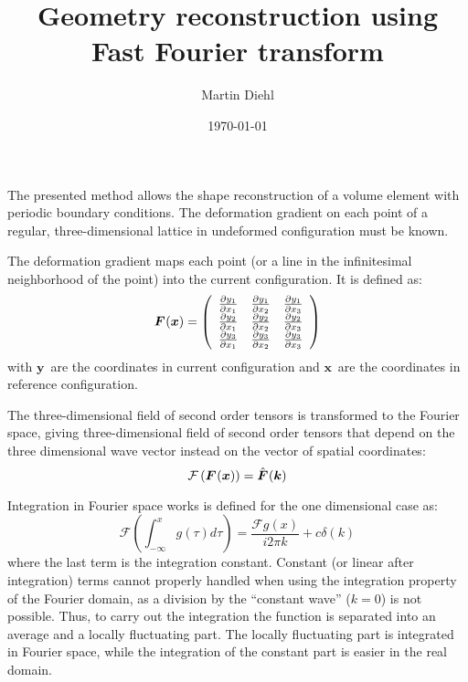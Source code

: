 \documentclass[a4paper,12pt]{article}
\title{Geometry reconstruction using Fast Fourier transform}
\date{\today}
\author{Martin Diehl}
\newcommand{\tnsr}[1]{\ensuremath{\bm{{#1}}}}
\newcommand{\vctr}[1]{\ensuremath{\bm{#1}}}
\newcommand{\F}[1][]{\ensuremath{\tnsr F^{{\rm #1}}}}
\begin{document}
\maketitle

The presented method allows the shape reconstruction of a volume element with periodic boundary conditions.
The deformation gradient on each point of a regular, three-dimensional lattice in undeformed configuration must be known.

The deformation gradient maps each point (or a line in the infinitesimal neighborhood of the point) into the current configuration.
It is defined as:
\begin{equation}
\F(\vctr x) = \left(
   \begin{array}{ccc}
     \frac{\partial y_1}{\partial x_1} & \frac{\partial y_1}{\partial x_2} & \frac{\partial y_1}{\partial x_3} \\
     \frac{\partial y_2}{\partial x_1} & \frac{\partial y_2}{\partial x_2} & \frac{\partial y_2}{\partial x_3} \\
     \frac{\partial y_3}{\partial x_1} & \frac{\partial y_3}{\partial x_2} & \frac{\partial y_3}{\partial x_3} \\
   \end{array}
\right)
\end{equation}
with \vctr y\ are the coordinates in current configuration and \vctr x\ are the coordinates in reference configuration.

The three-dimensional field of second order tensors is transformed to the Fourier space, giving three-dimensional field of second order tensors that depend on the three dimensional wave vector instead on the vector of spatial coordinates:
\begin{equation}
\mathcal F \left( \F(\vctr x) \right)=  \hat{\F}(\vctr k)
\end{equation}

Integration in Fourier space works is defined for the one dimensional case as:
\begin{equation}
\mathcal{F} \left( \int_{-\infty}^{x} g (\tau) d \tau \right) = \frac{\mathcal{F}{g(x)}}{i2 \pi k} + c \delta(k)
\end{equation}
where the last term is the integration constant.
Constant (or linear after integration) terms cannot properly handled when using the integration property of the Fourier domain, as a division by the ``constant wave'' ($k=0$) is not possible.
Thus, to carry out the integration the function is separated into an average and a locally fluctuating part.
The locally fluctuating part is integrated in Fourier space, while the integration of the constant part is easier in the real domain.
\end{document}
